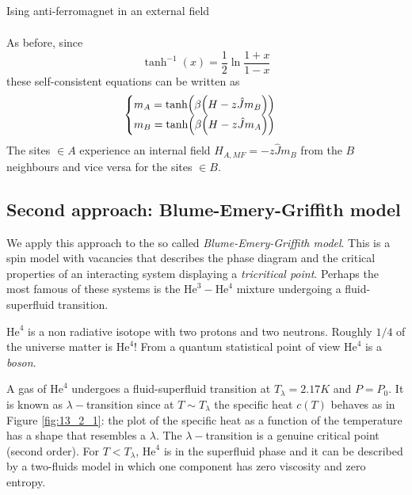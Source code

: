 \documentclass[../../Main/Main.tex]{subfiles}
\begin{document}
\begin{example}{Ising anti-ferromagnet in an external field}{}
\begin{itemize}
\begin{subequations}
\begin{align*}
\end{align*}
\end{subequations}
As before, since
\begin{equation*}
  \tanh^{-1} (x) = \frac{1}{2} \ln{\frac{1+x}{1-x}}
\end{equation*}
these self-consistent equations can be written as
\begin{equation}
  \begin{cases}
   m_A = \tanh ( \beta \qty(H - z \hat{J} m_B ) )\\
   m_B = \tanh ( \beta \qty(H - z \hat{J} m_A ) )
  \end{cases}
\end{equation}
The sites \( \in A \) experience an internal field \( H_{A,MF} = - z \hat{J} m_B \) from the \( B \) neighbours and vice versa for the sites \( \in B \).
\end{itemize}
\end{example}

\subsection{Second approach: Blume-Emery-Griffith model}
We apply this approach to the so called \emph{Blume-Emery-Griffith model}.
This is a spin model with vacancies that describes the phase diagram and the critical properties of an interacting system displaying a \emph{tricritical point}. Perhaps the most famous of these systems is the \( \text{He}^3-\text{He}^4 \) mixture undergoing a fluid-superfluid transition.

\begin{remark}
\( \text{He}^4 \)  is a non radiative isotope with two protons and two neutrons. Roughly \( 1/4 \) of the universe matter is \( \text{He}^4 \)!
From a quantum statistical point of view \( \text{He}^4 \) is a \emph{boson}.
\end{remark}

 A gas of \( \text{He}^4 \) undergoes a fluid-superfluid transition at \( T_ \lambda =2.17 K \) and \( P=P_0 \). It is known as \( \lambda - \)transition since at \( T \sim T_ \lambda  \)  the specific heat \( c(T) \) behaves as in Figure \ref{fig:13_2_1}: the plot of the specific heat as a function of the temperature has a shape that resembles a \(\lambda\). 
The \( \lambda - \)transition is a genuine critical point (second order). For \( T < T_{\lambda } \), \( \text{He}^4 \)  is in the superfluid phase and it can be described by a two-fluids model in which one component has zero viscosity and zero entropy.
\end{document}
